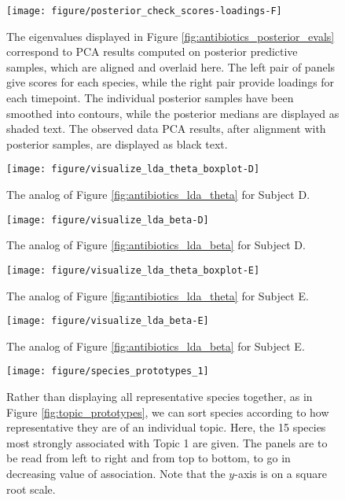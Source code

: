 \documentclass[oupdraft]{bio}
\begin{document}
\begin{figure}[!p]
  \centering
  \texttt{[image: figure/posterior\_check\_scores-loadings-F]}
  \caption{The eigenvalues displayed in Figure
    \ref{fig:antibiotics_posterior_evals} correspond to PCA results computed on
    posterior predictive samples, which are aligned and overlaid here. The left
    pair of panels give scores for each species, while the right pair provide
    loadings for each timepoint. The individual posterior samples have been
    smoothed into contours, while the posterior medians are displayed as shaded
    text. The observed data PCA results, after alignment with posterior samples,
    are displayed as black text. \label{fig:antibiotics_posterior_pca} }
\end{figure}

\begin{figure}[!p]
  \centering\texttt{[image: figure/visualize\_lda\_theta\_boxplot-D]}
  \caption{The analog of Figure \ref{fig:antibiotics_lda_theta} for Subject
    D. \label{fig:antibiotics_lda_theta_D}}
\end{figure}

\begin{figure}[!p]
  \centering\texttt{[image: figure/visualize\_lda\_beta-D]}
  \caption{The analog of Figure \ref{fig:antibiotics_lda_beta} for Subject D.}
\end{figure}

\begin{figure}[!p]
  \centering\texttt{[image: figure/visualize\_lda\_theta\_boxplot-E]}
  \caption{The analog of Figure \ref{fig:antibiotics_lda_theta} for Subject E.}
\end{figure}

\begin{figure}[!p]
  \centering\texttt{[image: figure/visualize\_lda\_beta-E]}
  \caption{The analog of Figure \ref{fig:antibiotics_lda_beta} for Subject E. \label{fig:antibiotics_lda_beta_E}}
\end{figure}

\begin{figure}[!p]
  \centering
  \texttt{[image: figure/species\_prototypes\_1]}
  \caption{Rather than displaying all representative species together, as in
    Figure \ref{fig:topic_prototypes}, we can sort species according to how
    representative they are of an individual topic. Here, the 15 species most
    strongly associated with Topic 1 are given. The panels are to be read from
    left to right and from top to bottom, to go in decreasing value of
    association. Note that the $y$-axis is on a square root
    scale. \label{fig:species_prototypes_1} }
\end{figure}
\end{document}
